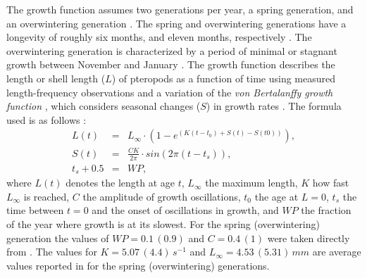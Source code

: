 The growth function assumes two generations per year, a spring generation, and an overwintering generation \citep{Wang2017Lifecycle}. The spring and overwintering generations have a longevity of roughly six months, and eleven months, respectively \citep{Wang2017Lifecycle}. The overwintering generation is characterized by a period of minimal or stagnant growth between November and January \citep{Wang2017Lifecycle}. The growth function describes the length or shell length ($L$) of pteropods as a function of time using measured length-frequency observations and a variation of the \textit{von Bertalanffy growth function} \citep[VBGF; ][]{Bertalanffy1938}, which considers seasonal changes ($S$) in growth rates \citep[Fig. \ref{fig:optimal_growth};][]{Wang2017Lifecycle}. The formula used is as follows \citep{Somers1988,Wang2017Lifecycle}:
\begin{eqnarray}
L(t) & = & L_{\infty} \cdot (1 - e^{(K(t-t_0) + S(t) - S(t0))}), \\
S(t) & = & \frac{CK}{2\pi} \cdot sin(2\pi (t-t_s)), \\
t_s + 0.5 & = & WP,
\end{eqnarray}
\noindent
where $L(t)$ denotes the length at age $t$, $L_{\infty}$ the maximum length, $K$ how fast $L_{\infty}$ is reached, $C$ the amplitude of growth oscillations, $t_0$ the age at $L=0$, $t_s$ the time between $t=0$ and the onset of oscillations in growth, and $WP$ the fraction of the year where growth is at its slowest. For the spring (overwintering) generation the values of $WP=0.1\,(0.9)$ and $C=0.4\,(1)$ were taken directly from \citep{Wang2017Lifecycle}. The values for $K=5.07\,(4.4)\, s^{-1}$ and $L_{\infty} = 4.53\,(5.31)\, mm$ are average values reported in \cite{Wang2017Lifecycle} for the spring (overwintering) generations. 

